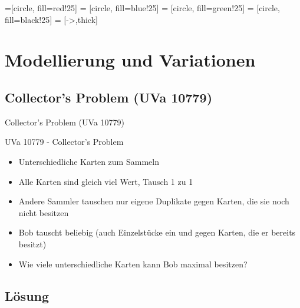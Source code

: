

=[circle, fill=red!25]
 = [circle, fill=blue!25]
 = [circle, fill=green!25]
 = [circle, fill=black!25]
 = [->,thick]


\section{Modellierung und Variationen}
    \subsection{Collector's Problem (UVa 10779)}
    \begin{frame}{Collector's Problem (UVa 10779)}
        \begin{block}{UVa 10779 - Collector's Problem}
            \begin{itemize}
                \item Unterschiedliche Karten zum Sammeln
                \pause\item Alle Karten sind gleich viel Wert, Tausch 1 zu 1
                \pause\item Andere Sammler tauschen nur eigene Duplikate gegen Karten,
                die sie noch nicht besitzen
                \pause\item Bob tauscht beliebig (auch Einzelstücke ein und gegen
                Karten, die er bereits besitzt)
                \pause\item Wie viele unterschiedliche Karten kann Bob maximal besitzen?
            \end{itemize}
        \end{block}
    \end{frame}

\subsection{Lösung}

